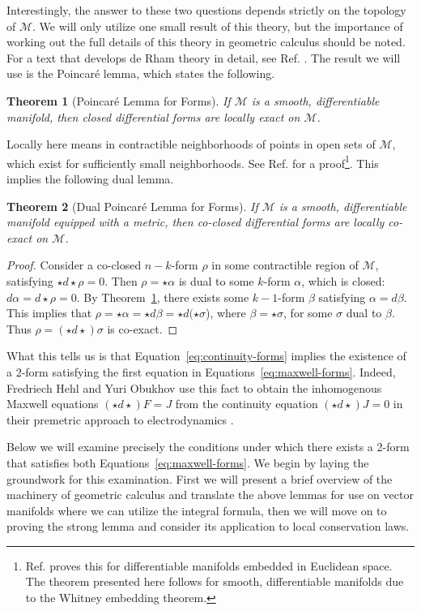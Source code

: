 \documentclass[twocolumn,notitlepage,nofootinbib,tightenlines]{revtex4-1}
\newtheorem{thm}{Theorem}[section]
\theoremstyle{definition}
\theoremstyle{remark}
\numberwithin{equation}{section}
\begin{document}
Interestingly, the answer to these two questions depends strictly on the topology of $\mathcal{M}$. We will only utilize one small result of this theory, but the importance of working out the full details of this theory in geometric calculus should be noted. For a text that develops de Rham theory in detail, see Ref. \cite{warner}. The result we will use is the Poincar\'e lemma, which states the following.
%
\begin{thm}[Poincar\'e Lemma for Forms]\label{thm:forms}
    If $\mathcal{M}$ is a smooth, differentiable manifold, then closed differential forms are locally exact on $\mathcal{M}$.
\end{thm}
%
\noindent Locally here means in contractible neighborhoods of points in open sets of $\mathcal{M}$, which exist for sufficiently small neighborhoods. See Ref. \cite{spivak} for a proof\footnote{Ref. \cite{spivak} proves this for differentiable manifolds embedded in Euclidean space. The theorem presented here follows for smooth, differentiable manifolds due to the Whitney embedding theorem.}. This implies the following dual lemma.
%
\begin{thm}[Dual Poincar\'e Lemma for Forms]\label{thm:dual-forms}
    If $\mathcal{M}$ is a smooth, differentiable manifold equipped with a metric, then co-closed differential forms are locally co-exact on $\mathcal{M}$.
\end{thm}
%
\begin{proof}
  Consider a co-closed $n-k$-form $\rho$ in some contractible region of $\mathcal{M}$, satisfying $\star d \star \rho = 0$. Then $\rho = \star \alpha$ is dual to some $k$-form $\alpha$, which is closed: $d \alpha = d \star \rho = 0$. By Theorem~\ref{thm:forms}, there exists some $k-1$-form $\beta$ satisfying $\alpha = d \beta$. This implies that $\rho = \star \alpha = \star d \beta = \star d (\star \sigma$), where $\beta = \star \sigma$, for some $\sigma$ dual to $\beta$. Thus $\rho = (\star d \star) \sigma$ is co-exact.
\end{proof}
%
What this tells us is that Equation~\ref{eq:continuity-forms} implies the existence of a 2-form satisfying the first equation in Equations~\ref{eq:maxwell-forms}. Indeed, Fredriech Hehl and Yuri Obukhov use this fact to obtain the inhomogenous Maxwell equations $(\star d \star) F = J$ from the continuity equation $(\star d \star) J = 0$ in their premetric approach to electrodynamics \cite{hehl}.

Below we will examine precisely the conditions under which there exists a 2-form that satisfies both Equations~\ref{eq:maxwell-forms}. We begin by laying the groundwork for this examination. First we will present a brief overview of the machinery of geometric calculus and translate the above lemmas for use on vector manifolds where we can utilize the integral formula, then we will move on to proving the strong lemma and consider its application to local conservation laws.
\end{document}
